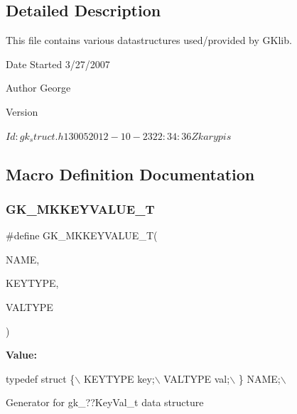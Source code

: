 \subsection{Detailed Description}
This file contains various datastructures used/provided by G\+Klib. 

\begin{DoxyDate}{Date}
Started 3/27/2007 
\end{DoxyDate}
\begin{DoxyAuthor}{Author}
George 
\end{DoxyAuthor}
\begin{DoxyVersion}{Version}
\begin{DoxyVerb}$Id: gk_struct.h 13005 2012-10-23 22:34:36Z karypis $ \end{DoxyVerb}
 
\end{DoxyVersion}


\subsection{Macro Definition Documentation}
\mbox{\label{a00080_ad11341707bef5a28f3747df28e8e5a8a}} 
\subsubsection{\texorpdfstring{G\+K\+\_\+\+M\+K\+K\+E\+Y\+V\+A\+L\+U\+E\+\_\+T}{GK\_MKKEYVALUE\_T}}
{\footnotesize\ttfamily \#define G\+K\+\_\+\+M\+K\+K\+E\+Y\+V\+A\+L\+U\+E\+\_\+T(\begin{DoxyParamCaption}\item[{}]{N\+A\+ME,  }\item[{}]{K\+E\+Y\+T\+Y\+PE,  }\item[{}]{V\+A\+L\+T\+Y\+PE }\end{DoxyParamCaption})}

{\bfseries Value\+:}
\begin{DoxyCode}
\textcolor{keyword}{typedef} \textcolor{keyword}{struct }\{\(\backslash\)
  KEYTYPE key;\(\backslash\)
  VALTYPE val;\(\backslash\)
\} NAME;\(\backslash\)
\end{DoxyCode}
Generator for gk\+\_\+??Key\+Val\+\_\+t data structure \mbox{\label{a00080_ad8628d4aab6d4dbf453f097bc493c152}} 
